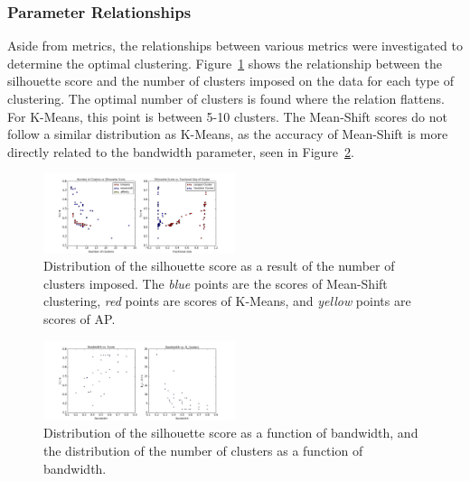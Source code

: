 \subsubsection{Parameter Relationships}
Aside from metrics, the relationships between various metrics were investigated to determine the optimal clustering.
Figure~\ref{fig:sscore} shows the relationship between the silhouette score and the number of clusters imposed on the data for each type of clustering. 
The optimal number of clusters is found where the relation flattens.
For K-Means, this point is between 5-10 clusters.
The Mean-Shift scores do not follow a similar distribution as K-Means, as the accuracy of Mean-Shift is more directly related to the bandwidth parameter, seen in Figure~\ref{fig:bwscore}.
\begin{figure}
\centering
\includegraphics[width=0.5\textwidth]{figs/silhouette_score_relation}
\caption{Distribution of the silhouette score as a result of the number of clusters imposed. The \textit{blue} points are the scores of Mean-Shift clustering, \textit{red} points are scores of K-Means, and \textit{yellow} points are scores of AP.}
\label{fig:sscore}
\end{figure}

\begin{figure}
\centering
\includegraphics[width=0.5\textwidth]{figs/meanshift_parameters}
\caption{Distribution of the silhouette score as a function of bandwidth, and the distribution of the number of clusters as a function of bandwidth.}
\label{fig:bwscore}
\end{figure}
